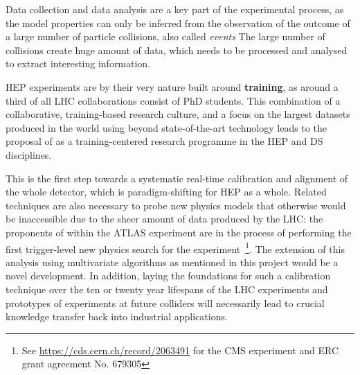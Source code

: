 Data collection and data analysis are 
a key part of the experimental process, as the model properties can only be inferred
from the observation of the outcome of a large number of particle collisions, 
also called \textit{events}
The large number of collisions create huge amount of data, which needs
to be processed and analysed to extract interesting information. 



HEP experiments are by their very nature built around \textbf{training}, 
as around a third of all LHC collaborations consist of PhD students.
This combination of a collaborative, training-based research culture, and a focus on the largest datasets
produced in the world using beyond state-of-the-art technology
leads to the proposal of \acronym as a training-centered research programme in the HEP and DS disciplines.





This is the first step towards a systematic real-time calibration and alignment of the whole detector,
which is paradigm-shifting for HEP as a whole. 
Related techniques are also necessary to probe new physics models that otherwise would be 
inaccessible due to the sheer amount of data produced by the LHC: the proponents of \acronym within the ATLAS experiment
are in the process of performing the first trigger-level new physics search for the experiment~\footnote{See \href{https://cds.cern.ch/record/2063491}{https://cds.cern.ch/record/2063491} 
for the CMS experiment and ERC grant agreement No. 679305}.
The extension of this analysis using multivariate
algorithms as mentioned in this project would be a novel development.  
In addition, laying the foundations for such
a calibration technique over the ten or twenty year lifespans of the LHC experiments and prototypes 
of experiments at future colliders will necessarily lead
to crucial knowledge transfer back into industrial applications.



